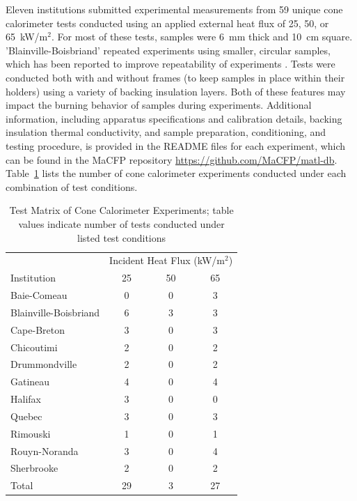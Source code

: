 \documentclass{book}
\begin{document}
Eleven institutions submitted experimental measurements from 59 unique cone calorimeter tests conducted using an applied external heat flux of 25, 50, or 65~kW/m$^2$. For most of these tests, samples were 6~mm thick and 10~cm square. 'Blainville-Boisbriand' repeated experiments using smaller, circular samples, which has been reported to improve repeatability of experiments \cite{vermina2019experimental}. Tests were conducted both with and without frames (to keep samples in place within their holders) using a variety of backing insulation layers. Both of these features may impact the burning behavior of samples during experiments. Additional information, including apparatus specifications and calibration details, backing insulation thermal conductivity, and sample preparation, conditioning, and testing procedure, is provided in the README files for each experiment, which can be found in the MaCFP repository \href{https://github.com/MaCFP/matl-db}{https://github.com/MaCFP/matl-db}. Table~\ref{Table:Cone_Matrix} lists the number of cone calorimeter experiments conducted under each combination of test conditions.

\begin{table}[ht]
\caption{Test Matrix of Cone Calorimeter Experiments; table values indicate number of tests conducted under listed test conditions}
\label{Table:Cone_Matrix}
\begin{center}
\begin{tabular}{lccc}
\hline
                        & \multicolumn{3}{c}{Incident Heat Flux (kW/m$^2$)} \\ %
Institution             & 25 & 50 & 65       \\ \hline
Baie-Comeau             & 0     & 0     & 3  \\
Blainville-Boisbriand   & 6     & 3     & 3  \\
Cape-Breton             & 3     & 0     & 3  \\
Chicoutimi              & 2     & 0     & 2  \\
Drummondville           & 2     & 0     & 2  \\
Gatineau                & 4     & 0     & 4  \\
Halifax                 & 3     & 0     & 0  \\
Quebec                  & 3     & 0     & 3  \\
Rimouski                & 1     & 0     & 1  \\
Rouyn-Noranda           & 3     & 0     & 4  \\
Sherbrooke              & 2     & 0     & 2  \\ \hline
Total                   & 29    & 3     & 27 \\ \hline
\end{tabular}
\end{center}
\end{table}
\end{document}
